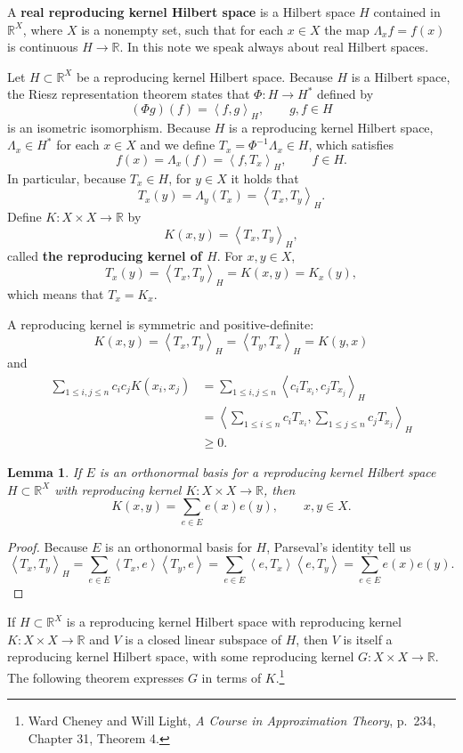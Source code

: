 \documentclass{article}
\newcommand{\inner}[2]{\left\langle #1, #2 \right\rangle}
\newtheorem{lemma}[theorem]{Lemma}
\theoremstyle{definition}
\begin{document}
A \textbf{real reproducing kernel Hilbert space}
is a Hilbert space $H$ contained in $\mathbb{R}^X$, where $X$ is a nonempty set, such that for each $x \in X$ the map
$\Lambda_x f = f(x)$ is continuous $H \to \mathbb{R}$. In this note we speak always about real
Hilbert spaces.

Let $H \subset \mathbb{R}^X$ be a reproducing kernel Hilbert space. Because $H$ is a Hilbert
space, the Riesz
representation theorem states that
$\Phi:H \to H^*$ defined by
\[
(\Phi g)(f)=\inner{f}{g}_H,\qquad g,f \in H
\]
is an isometric isomorphism.
Because $H$ is a reproducing kernel Hilbert space, 
$\Lambda_x \in H^*$ for each $x \in X$ and we define $T_x=\Phi^{-1}\Lambda_x \in H$, which satisfies
\[
f(x) = \Lambda_x(f) = \inner{f}{T_x}_H,\qquad f \in H.
\]
In particular, because $T_x \in H$, for $y \in X$ it holds that
\[
T_x(y) = \Lambda_y(T_x) = \inner{T_x}{T_y}_H.
\]
Define $K:X \times X \to \mathbb{R}$ by
\[
K(x,y) = \inner{T_x}{T_y}_H,
\]
called  \textbf{the reproducing kernel of $H$}.
For $x,y \in X$,
\[
T_x(y) = \inner{T_x}{T_y}_H = K(x,y) = K_x(y),
\]
which means that $T_x = K_x$. 

A reproducing kernel is symmetric and positive-definite:
\[
K(x,y) = \inner{T_x}{T_y}_H = \inner{T_y}{T_x}_H = K(y,x)
\]
and
\begin{align*}
\sum_{1 \leq i,j \leq n} c_i c_j K(x_i,x_j) &= \sum_{1 \leq i,j \leq n}  \inner{c_i T_{x_i}}{c_j T_{x_j}}_H\\
&=\inner{\sum_{1 \leq i \leq n} c_i T_{x_i}}{\sum_{1 \leq j \leq n} c_j T_{x_j}}_H\\
&\geq 0.
\end{align*}

\begin{lemma}
If $E$ is an orthonormal basis for a reproducing kernel Hilbert space $H \subset \mathbb{R}^X$ with
reproducing kernel $K:X \times X \to \mathbb{R}$,
then
\[
K(x,y) = \sum_{e \in E} e(x)e(y),\qquad x,y \in X.
\]
\end{lemma}
\begin{proof}
Because $E$ is an orthonormal basis for $H$,
Parseval's identity tell us 
\[
\inner{T_x}{T_y}_H = \sum_{e \in E} \inner{T_x}{e} \inner{T_y}{e} = \sum_{e \in E} \inner{e}{T_x} \inner{e}{T_y}
=\sum_{e \in E} e(x) e(y).
\]
\end{proof}


If $H \subset \mathbb{R}^X$ is a reproducing kernel Hilbert space with reproducing kernel $K:X \times X \to \mathbb{R}$ and
$V$ is  a closed linear subspace of $H$, then $V$ is itself a reproducing kernel Hilbert space, with some reproducing kernel
$G:X \times X \to \mathbb{R}$. 
The following theorem expresses $G$ in terms of $K$.\footnote{Ward Cheney and Will Light, {\em A Course in Approximation Theory}, p.~234, Chapter 31, Theorem 4.}
\end{document}
